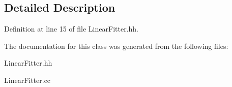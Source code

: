 \subsection{Detailed Description}


Definition at line 15 of file LinearFitter.hh.

The documentation for this class was generated from the following files:\begin{DoxyCompactItemize}
\item 
LinearFitter.hh\item 
LinearFitter.cc\end{DoxyCompactItemize}
